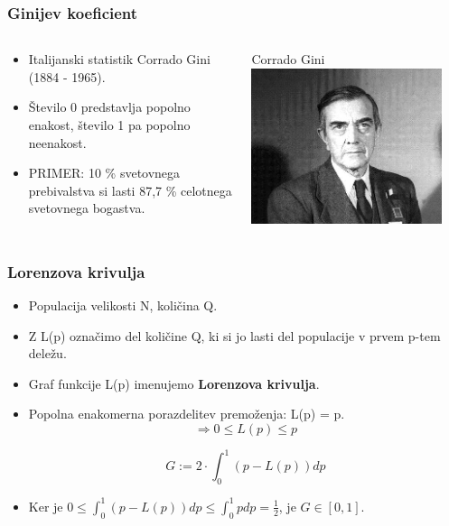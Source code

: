 \documentclass[10pt]{beamer}
\begin{document}
\begin{frame}
\frametitle{Ginijev koeficient}

\begin{columns}[T]
    \begin{column}{.5\textwidth}
     \begin{block}{}
\begin{itemize}
\item Italijanski statistik Corrado Gini (1884 - 1965).
\item Število 0 predstavlja popolno enakost, število 1 pa popolno neenakost. 
\item PRIMER: 10 \% svetovnega prebivalstva si lasti 87,7 \% celotnega svetovnega bogastva.
\end{itemize}
    \end{block}{}
    \end{column}
    \begin{column}{.5\textwidth}
    \begin{block}{Corrado Gini}
    \includegraphics[width=0.9\textwidth]{./slike/corrado-gini.jpg}
    \end{block}{}
    \end{column}
  \end{columns}
\end{frame}

\begin{frame}
\frametitle{Lorenzova krivulja}
\begin{itemize}
\item Populacija velikosti N, količina Q. 
\item Z L(p) označimo del količine Q, ki si jo lasti del populacije v prvem p-tem deležu.
\item Graf funkcije L(p) imenujemo \textbf{Lorenzova krivulja}.
\item Popolna enakomerna porazdelitev premoženja: L(p) = p.
$$\Rightarrow 0 \leq L(p) \leq p$$
\begin{tcolorbox}[colback=black!5,colframe=red!40!black,title=Ginijev koeficient]
$$G := 2 \cdot \int_{0}^{1} (p - L(p)) dp$$
\end{tcolorbox}
\item Ker je  $0 \leq \int_{0}^{1} (p - L(p)) dp \leq \int_{0}^{1} p dp = \frac{1}{2}$, je $G \in [0, 1].$
\end{itemize}
\end{frame}
\end{document}
